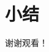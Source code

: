 \documentclass{styles/cuzbeamer}
\begin{document}
    \section{小结}

    \begin{standout}[]
        谢谢观看！
    \end{standout}
\end{document}
